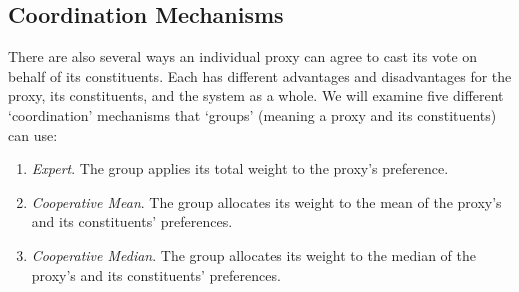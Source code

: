 \subsection{Coordination Mechanisms}
\label{subsec:coordination-mechanisms}
There are also several ways an individual proxy can agree to cast its vote on behalf
of its constituents.
Each has different advantages and disadvantages for the proxy, its constituents, and
the system as a whole.
We will examine five different `coordination' mechanisms that `groups' (meaning a
proxy and its constituents) can use:
\begin{enumerate}
    \item {
        \textit{Expert}.
        The group applies its total weight to the proxy's preference.
    }
    \item {
        \textit{Cooperative Mean}.
        The group allocates its weight to the mean of the proxy's and its
        constituents' preferences.
    }
    \item {
        \textit{Cooperative Median}.
        The group allocates its weight to the median of the proxy's and its
        constituents' preferences.
    }

\end{enumerate}
